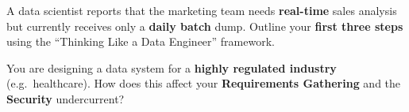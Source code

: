 \documentclass[12pt,addpoints]{exam}
\begin{document}
\vspace{2pt}
\begin{questions}
\setcounter{question}{0}

\question[3] A data scientist reports that the marketing team needs \textbf{real-time} sales analysis but currently receives only a \textbf{daily batch} dump. Outline your \textbf{first three steps} using the ``Thinking Like a Data Engineer'' framework.

\question[3] You are designing a data system for a \textbf{highly regulated industry} (e.g.\ healthcare). How does this affect your \textbf{Requirements Gathering} and the \textbf{Security} undercurrent?
\fillwithdottedlines{14em}

\end{questions}

\end{document}

